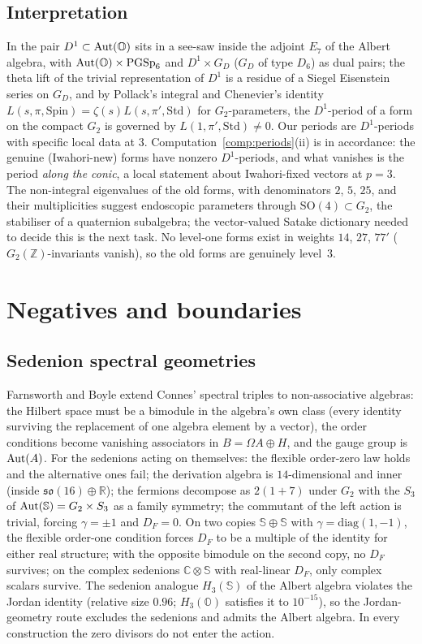 \documentclass[11pt]{amsart}
\theoremstyle{definition}
\renewcommand{\O}{\mathbb{O}}\newcommand{\Sd}{\mathbb{S}}\newcommand{\Hq}{\mathbb{H}}\newcommand{\Z}{\mathbb{Z}}\newcommand{\Q}{\mathbb{Q}}\newcommand{\R}{\mathbb{R}}\newcommand{\C}{\mathbb{C}}\newcommand{\F}{\mathbb{F}}
\begin{document}
\subsection{Interpretation}
In \cite{GanSavin} the pair $D^1\subset\Aut(\O)$ sits in a see-saw inside the adjoint $E_7$ of the Albert algebra, with $\Aut(\O)\times\mathrm{PGSp}_6$ and $D^1\times G_D$ ($G_D$ of type $D_6$) as dual pairs; the theta lift of the trivial representation of $D^1$ is a residue of a Siegel Eisenstein series on $G_D$, and by Pollack's integral and Chenevier's identity $L(s,\pi,\mathrm{Spin})=\zeta(s)L(s,\pi',\mathrm{Std})$ for $G_2$-parameters, the $D^1$-period of a form on the compact $G_2$ is governed by $L(1,\pi',\mathrm{Std})\ne 0$. Our periods are $D^1$-periods with specific local data at $3$. Computation~\ref{comp:periods}(ii) is in accordance: the genuine (Iwahori-new) forms have nonzero $D^1$-periods, and what vanishes is the period \emph{along the conic}, a local statement about Iwahori-fixed vectors at $p=3$. The non-integral eigenvalues of the old forms, with denominators $2$, $5$, $25$, and their multiplicities suggest endoscopic parameters through $\mathrm{SO}(4)\subset G_2$, the stabiliser of a quaternion subalgebra; the vector-valued Satake dictionary needed to decide this is the next task. No level-one forms exist in weights $14$, $27$, $77'$ ($G_2(\Z)$-invariants vanish), so the old forms are genuinely level~$3$.

\section{Negatives and boundaries}\label{sec:negatives}
\subsection{Sedenion spectral geometries}
Farnsworth and Boyle \cite{FB13,BF14} extend Connes' spectral triples to non-associative algebras: the Hilbert space must be a bimodule in the algebra's own class (every identity surviving the replacement of one algebra element by a vector), the order conditions become vanishing associators in $B=\Omega A\oplus H$, and the gauge group is $\operatorname{Aut}(A)$. For the sedenions acting on themselves: the flexible order-zero law holds and the alternative ones fail; the derivation algebra is $14$-dimensional and inner (inside $\mathfrak{so}(16)\oplus\R$); the fermions decompose as $2(1+7)$ under $G_2$ with the $S_3$ of $\Aut(\Sd)=G_2\times S_3$ as a family symmetry; the commutant of the left action is trivial, forcing $\gamma=\pm 1$ and $D_F=0$. On two copies $\Sd\oplus\Sd$ with $\gamma=\mathrm{diag}(1,-1)$, the flexible order-one condition forces $D_F$ to be a multiple of the identity for either real structure; with the opposite bimodule on the second copy, no $D_F$ survives; on the complex sedenions $\C\otimes\Sd$ with real-linear $D_F$, only complex scalars survive. The sedenion analogue $H_3(\Sd)$ of the Albert algebra violates the Jordan identity (relative size $0.96$; $H_3(\O)$ satisfies it to $10^{-15}$), so the Jordan-geometry route \cite{BF14} excludes the sedenions and admits the Albert algebra. In every construction the zero divisors do not enter the action.
\end{document}
